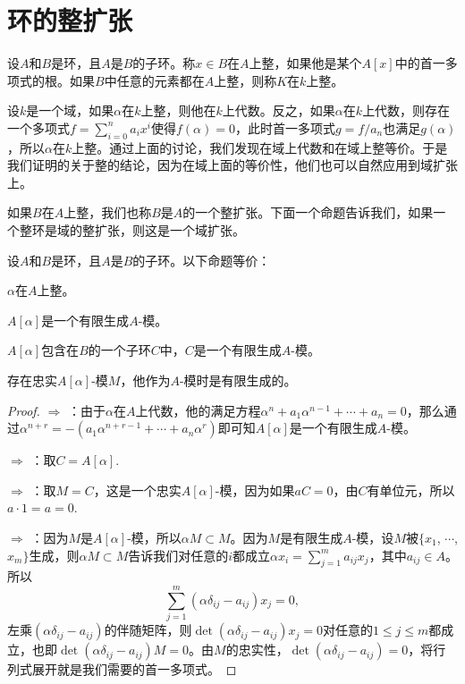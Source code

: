 \section{环的整扩张}

\para 设$A$和$B$是环，且$A$是$B$的子环。称$x\in B$在$A$上整，如果他是某个$A[x]$中的首一多项式的根。如果$B$中任意的元素都在$A$上整，则称$K$在$k$上整。

设$k$是一个域，如果$\alpha$在$k$上整，则他在$k$上代数。反之，如果$\alpha$在$k$上代数，则存在一个多项式$f=\sum_{i=0}^na_ix^i$使得$f(\alpha)=0$，此时首一多项式$g=f/a_n$也满足$g(\alpha)$，所以$\alpha$在$k$上整。通过上面的讨论，我们发现在域上代数和在域上整等价。于是我们证明的关于整的结论，因为在域上面的等价性，他们也可以自然应用到域扩张上。

如果$B$在$A$上整，我们也称$B$是$A$的一个整扩张。下面一个命题告诉我们，如果一个整环是域的整扩张，则这是一个域扩张。

\begin{pro}\label{p2:1}
	设$A$和$B$是环，且$A$是$B$的子环。以下命题等价：
	\begin{compactenum}[~~~(1)]
		\item $\alpha$在$A$上整。
		\item $A[\alpha]$是一个有限生成$A$-模。
		\item $A[\alpha]$包含在$B$的一个子环$C$中，$C$是一个有限生成$A$-模。
		\item 存在忠实$A[\alpha]$-模$M$，他作为$A$-模时是有限生成的。
	\end{compactenum}
\end{pro}	

\begin{proof} 
	 $\Rightarrow$  ：由于$\alpha$在$A$上代数，他的满足方程$\alpha^n+a_1\alpha^{n-1}+\cdots+a_n=0$，那么通过$\alpha^{n+r}=-(a_1\alpha^{n+r-1}+\cdots+a_n\alpha^r)$即可知$A[\alpha]$是一个有限生成$A$-模。

	 $\Rightarrow$  ：取$C=A[\alpha]$.

	 $\Rightarrow$  ：取$M=C$，这是一个忠实$A[\alpha]$-模，因为如果$aC=0$，由$C$有单位元，所以$a\cdot 1=a=0$.

	 $\Rightarrow$  ：因为$M$是$A[\alpha]$-模，所以$\alpha M\subset M$。因为$M$是有限生成$A$-模，设$M$被$\{x_1$, $\cdots$, $x_m\}$生成，则$\alpha M\subset M$告诉我们对任意的$i$都成立$\alpha x_i=\sum_{j=1}^m a_{ij} x_j$，其中$a_{ij}\in A$。所以
	\[
		\sum_{j=1}^m (\alpha\delta_{ij} -a_{ij})x_j=0,
	\]
	左乘$(\alpha\delta_{ij} -a_{ij})$的伴随矩阵，则$\det(\alpha\delta_{ij} -a_{ij})x_j=0$对任意的$1\leq j \leq m$都成立，也即$\det(\alpha\delta_{ij} -a_{ij})M=0$。由$M$的忠实性，$\det(\alpha\delta_{ij} -a_{ij})=0$，将行列式展开就是我们需要的首一多项式。
\end{proof}

